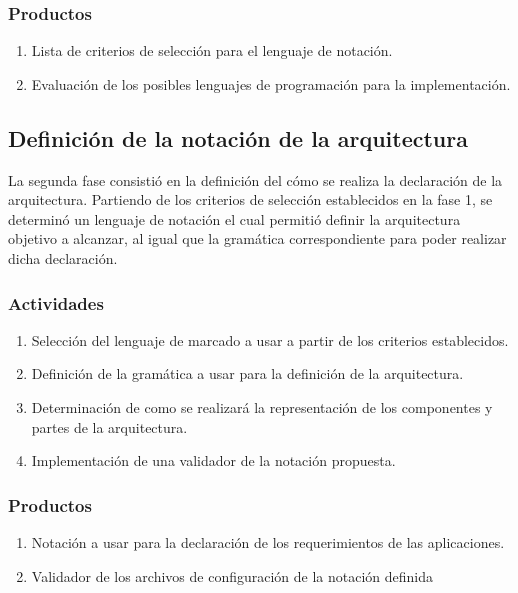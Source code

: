 \subsubsection*{Productos}

\begin{enumerate}
    \itemsep-2mm
    \item Lista de criterios de selección para el lenguaje de notación.
    \item Evaluación de los posibles lenguajes de programación para la implementación.
\end{enumerate}

\subsection{Definición de la notación de la arquitectura}

La segunda fase consistió en la definición del cómo se realiza la declaración de la arquitectura. Partiendo de los criterios de selección establecidos en la fase 1, se determinó un lenguaje de notación el cual permitió definir la arquitectura objetivo a alcanzar, al igual que la gramática correspondiente para poder realizar dicha declaración. 

\subsubsection*{Actividades}

\begin{enumerate}
    \itemsep-2mm
    \item Selección del lenguaje de marcado a usar a partir de los criterios establecidos.
    \item Definición de la gramática a usar para la definición de la arquitectura.
    \item Determinación de como se realizará la representación de los componentes y partes de la arquitectura.
    \item Implementación de una validador de la notación propuesta.
\end{enumerate}    

\subsubsection*{Productos}

\begin{enumerate}
    \itemsep-2mm
    \item Notación a usar para la declaración de los requerimientos de las aplicaciones.
    \item Validador de los archivos de configuración de la notación definida
\end{enumerate}

